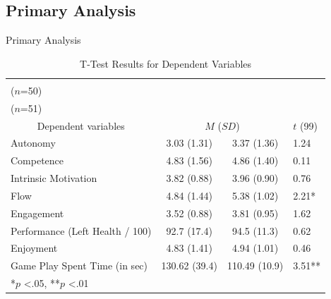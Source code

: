 \documentclass{beamer}
\begin{document}
\subsection{Primary Analysis}
\begin{frame}{Primary Analysis}

\begin{table}[h]
\captionsetup{labelfont=bf, justification=justified,singlelinecheck=false}
\caption[T-Test Results for Dependent Variables]{T-Test Results for Dependent Variables}
\label {table:primaryresults}
\fontsize{8pt}{8}\selectfont
{\renewcommand{\arraystretch}{1.2}
\begin{tabularx}{1.0\textwidth}{lccl}
\hline
\multicolumn{1}{c}{} & \begin{tabular}[c]{@{}c@{}}Control Group \\ ($n$=50)\end{tabular} & \begin{tabular}[c]{@{}c@{}}Experimental Group\\ ($n$=51)\end{tabular} &   \\ \hline
\multicolumn{1}{c}{Dependent variables} & \multicolumn{2}{c}{$M$ ($SD$)} & $t$ (99) \\ \hline
Autonomy & 3.03 (1.31) & 3.37 (1.36) & 1.24 \\
Competence & 4.83 (1.56) & 4.86 (1.40) & 0.11\\
Intrinsic Motivation & 3.82 (0.88) & 3.96 (0.90) & 0.76 \\
Flow & 4.84 (1.44) & 5.38 (1.02) & 2.21* \\
Engagement & 3.52 (0.88) & 3.81 (0.95) & 1.62 \\
Performance (Left Health / 100) & 92.7 (17.4) & 94.5 (11.3) & 0.62 \\
Enjoyment & 4.83 (1.41) & 4.94 (1.01) & 0.46 \\
Game Play Spent Time (in sec) & 130.62 (39.4) & 110.49 (10.9) & 3.51** \\ \hline
*$p$ \textless .05, **$p$ \textless .01 & \multicolumn{1}{l}{} & \multicolumn{1}{l}{} & \multicolumn{1}{l}{}
\end{tabularx}}
\end{table} 

\end{frame}
\end{document}

